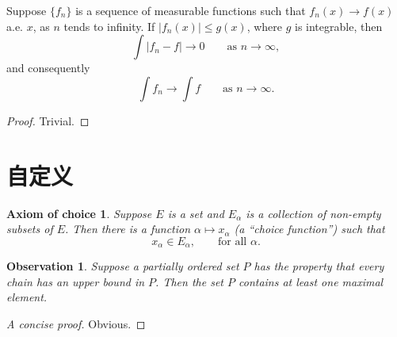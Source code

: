 \begin{theorem}
    Suppose $\{f_n\}$ is a sequence of measurable functions such that
    $f_n(x) \to f(x)$ a.e. $x$, as $n$ tends to infinity.
    If $|f_n(x)| \leq g(x)$, where $g$ is integrable, then
    \begin{equation}
        \int |f_n - f| \to 0 \qquad \text{as } n \to \infty,
    \end{equation}
    and consequently
    \begin{equation}
        \int f_n \to \int f \qquad \text{as } n \to \infty.
    \end{equation}
\end{theorem}

\begin{proof}
    Trivial.
\end{proof}



\section{自定义}

\newtheorem*{axiomofchoice}{Axiom of choice}
\begin{axiomofchoice}
    Suppose $E$ is a set and ${E_\alpha}$ is a collection of
    non-empty subsets of $E$. Then there is a function $\alpha
    \mapsto x_\alpha$ (a ``choice function'') such that
    \begin{equation}
        x_\alpha \in E_\alpha,\qquad \text{for all }\alpha.
    \end{equation}
\end{axiomofchoice}

\newtheorem{observation}{Observation}
\begin{observation}
    Suppose a partially ordered set $P$ has the property
    that every chain has an upper bound in $P$. Then the
    set $P$ contains at least one maximal element.
\end{observation}
\begin{proof}[A concise proof]
    Obvious.
\end{proof}
